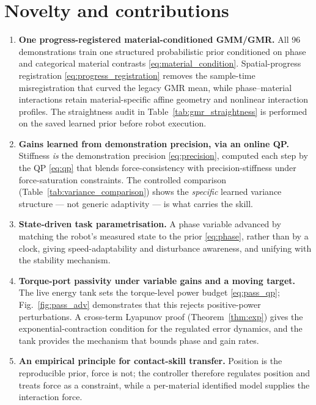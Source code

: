 \documentclass[11pt,a4paper]{article}
\begin{document}
\section{Novelty and contributions}
\begin{enumerate}[leftmargin=1.7em]
\item \textbf{One progress-registered material-conditioned GMM/GMR.}
All 96 demonstrations train one structured probabilistic prior conditioned on
phase and categorical material contrasts
\eqref{eq:material_condition}. Spatial-progress registration
\eqref{eq:progress_registration} removes the sample-time misregistration that
curved the legacy GMR mean, while phase--material interactions retain
material-specific affine geometry and nonlinear interaction profiles. The
straightness audit in Table~\ref{tab:gmr_straightness} is performed on the
saved learned prior before robot execution.
\item \textbf{Gains learned from demonstration precision, via an online QP.}
Stiffness \emph{is} the demonstration precision \eqref{eq:precision}, computed each
step by the QP \eqref{eq:qp} that blends force-consistency with precision-stiffness
under force-saturation constraints. The controlled comparison
(Table~\ref{tab:variance_comparison}) shows
the \emph{specific} learned variance structure --- not generic adaptivity --- is
what carries the skill.
\item \textbf{State-driven task parametrisation.} A phase variable advanced by
matching the robot's measured state to the prior \eqref{eq:phase}, rather than by a
clock, giving speed-adaptability and disturbance awareness, and unifying with the
stability mechanism.
\item \textbf{Torque-port passivity under variable gains and a moving target.}
The live energy tank sets the torque-level power budget \eqref{eq:pass_qp};
Fig.~\ref{fig:pass_adv} demonstrates that this rejects positive-power
perturbations. A cross-term Lyapunov proof (Theorem~\ref{thm:exp}) gives the
exponential-contraction condition for the regulated error dynamics, and the tank
provides the mechanism that bounds phase and gain rates.
\item \textbf{An empirical principle for contact-skill transfer.} Position is the
reproducible prior, force is not; the controller therefore regulates position and
treats force as a constraint, while a per-material identified model supplies the
interaction force.
\end{enumerate}
\end{document}
